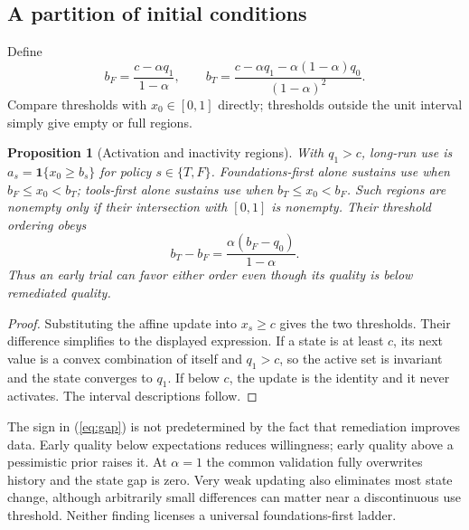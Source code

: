 \documentclass[11pt]{article}
\newtheorem{proposition}{Proposition}
\newcommand{\ind}{\mathbf{1}}
\begin{document}
\subsection{A partition of initial conditions}
Define
\begin{equation}
 b_F=\frac{c-\alpha q_1}{1-\alpha},\qquad
 b_T=\frac{c-\alpha q_1-\alpha(1-\alpha)q_0}{(1-\alpha)^2}.
\end{equation}
Compare thresholds with $x_0\in[0,1]$ directly; thresholds outside the unit interval simply give empty or full regions.
\begin{proposition}[Activation and inactivity regions]\label{prop:partition}
With $q_1>c$, long-run use is $a_s=\ind\{x_0\geq b_s\}$ for policy $s\in\{T,F\}$. Foundations-first alone sustains use when $b_F\leq x_0<b_T$; tools-first alone sustains use when $b_T\leq x_0<b_F$. Such regions are nonempty only if their intersection with $[0,1]$ is nonempty. Their threshold ordering obeys
\begin{equation}
 b_T-b_F=\frac{\alpha(b_F-q_0)}{1-\alpha}.
\end{equation}
Thus an early trial can favor either order even though its quality is below remediated quality.
\end{proposition}
\begin{proof}
Substituting the affine update into $x_s\geq c$ gives the two thresholds. Their difference simplifies to the displayed expression. If a state is at least $c$, its next value is a convex combination of itself and $q_1>c$, so the active set is invariant and the state converges to $q_1$. If below $c$, the update is the identity and it never activates. The interval descriptions follow.
\end{proof}

The sign in (\ref{eq:gap}) is not predetermined by the fact that remediation improves data. Early quality below expectations reduces willingness; early quality above a pessimistic prior raises it. At $\alpha=1$ the common validation fully overwrites history and the state gap is zero. Very weak updating also eliminates most state change, although arbitrarily small differences can matter near a discontinuous use threshold. Neither finding licenses a universal foundations-first ladder.
\end{document}
